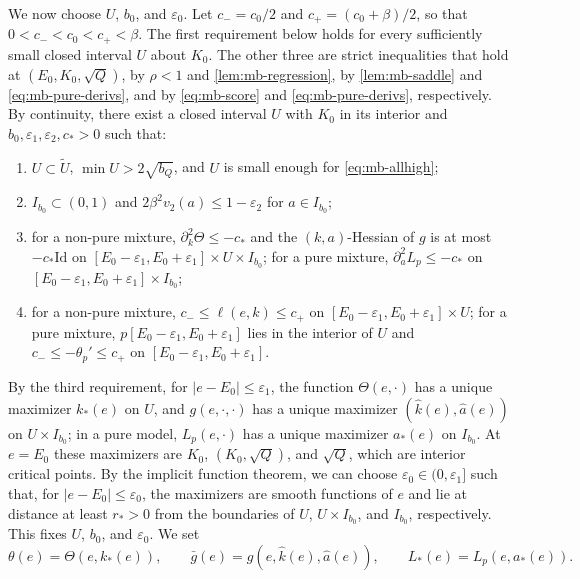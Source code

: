We now choose $U$, $b_0$, and $\varepsilon_0$. Let $c_-=c_0/2$ and $c_+=(c_0+\beta)/2$, so that $0<c_-<c_0<c_+<\beta$. The first requirement below holds for every sufficiently small closed interval $U$ about $K_0$. The other three are strict inequalities that hold at $(E_0,K_0,\sqrt Q)$, by $\rho<1$ and \cref{lem:mb-regression}, by \cref{lem:mb-saddle} and \eqref{eq:mb-pure-derivs}, and by \eqref{eq:mb-score} and \eqref{eq:mb-pure-derivs}, respectively. By continuity, there exist a closed interval $U$ with $K_0$ in its interior and $b_0,\varepsilon_1,\varepsilon_2,c_*>0$ such that:
\begin{enumerate}
\item $U\subset \widetilde U$, $\min U>2\sqrt{b_Q}$, and $U$ is small enough for \eqref{eq:mb-allhigh};
\item $I_{b_0}\subset(0,1)$ and $2\beta^2v_2(a)\le1-\varepsilon_2$ for $a\in I_{b_0}$;
\item for a non-pure mixture, $\partial_k^2\Theta\le-c_*$ and the $(k,a)$-Hessian of $g$ is at most $-c_*\mathrm{Id}$ on $[E_0-\varepsilon_1,E_0+\varepsilon_1]\times U\times I_{b_0}$; for a pure mixture, $\partial_a^2L_p\le-c_*$ on $[E_0-\varepsilon_1,E_0+\varepsilon_1]\times I_{b_0}$;
\item for a non-pure mixture, $c_-\le\ell(e,k)\le c_+$ on $[E_0-\varepsilon_1,E_0+\varepsilon_1]\times U$; for a pure mixture, $p[E_0-\varepsilon_1,E_0+\varepsilon_1]$ lies in the interior of $U$ and $c_-\le-\theta_p'\le c_+$ on $[E_0-\varepsilon_1,E_0+\varepsilon_1]$.
\end{enumerate}
By the third requirement, for $|e-E_0|\le\varepsilon_1$, the function $\Theta(e,\cdot)$ has a unique maximizer $k_*(e)$ on $U$, and $g(e,\cdot,\cdot)$ has a unique maximizer $(\widehat k(e),\widehat a(e))$ on $U\times I_{b_0}$; in a pure model, $L_p(e,\cdot)$ has a unique maximizer $a_*(e)$ on $I_{b_0}$. At $e=E_0$ these maximizers are $K_0$, $(K_0,\sqrt Q)$, and $\sqrt Q$, which are interior critical points. By the implicit function theorem, we can choose $\varepsilon_0\in(0,\varepsilon_1]$ such that, for $|e-E_0|\le\varepsilon_0$, the maximizers are smooth functions of $e$ and lie at distance at least $r_*>0$ from the boundaries of $U$, $U\times I_{b_0}$, and $I_{b_0}$, respectively. This fixes $U$, $b_0$, and $\varepsilon_0$. We set
\[
\theta(e)=\Theta(e,k_*(e)),\qquad\bar g(e)=g(e,\widehat k(e),\widehat a(e)),\qquad L_*(e)=L_p(e,a_*(e)).
\]

